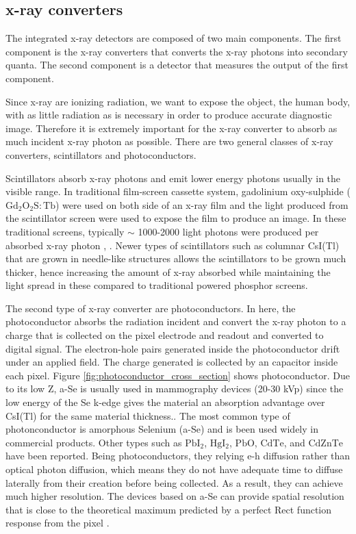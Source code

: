 \subsection{x-ray converters}
The integrated x-ray detectors are composed of two main components.  The first component is the x-ray converters that converts the x-ray photons into secondary quanta.  The second component is a detector that measures the output of the first component.

Since x-ray are ionizing radiation, we want to expose the object, the human body, with as little radiation as is necessary in order to produce accurate diagnostic image.  Therefore it is extremely important for the x-ray converter to absorb as much incident x-ray photon as possible.  There are two general classes of x-ray converters, scintillators and photoconductors. 

Scintillators absorb x-ray photons and emit lower energy photons usually in the visible range.  In traditional film-screen cassette system, gadolinium oxy-sulphide ($\mathrm{Gd_2O_2S:Tb}$) were used on both side of an x-ray film and the light produced from the scintillator screen were used to expose the film to produce an image.  In these traditional screens, typically $\sim$ 1000-2000 light photons were produced per absorbed x-ray photon \cite{trauernicht1988}, \cite{trauernicht1990}. Newer types of scintillators such as columnar CsI(Tl) that are grown in needle-like structures allows the scintillators to be grown much thicker, hence increasing the amount of x-ray absorbed while maintaining the light spread in these compared to traditional powered phosphor screens.

The second type of x-ray converter are photoconductors.  In here,  the photoconductor absorbs the radiation incident and convert the x-ray photon to a charge that is collected on the pixel electrode and readout and converted to digital signal.  The electron-hole pairs generated inside the photoconductor drift under an applied field.  The charge generated is collected by an capacitor inside each pixel. Figure \ref{fig:photoconductor_cross_section} shows photoconductor.  Due to its low Z, a-Se is usually used in mammography devices (20-30 kVp) since the low energy of the Se k-edge gives the material an absorption advantage over CsI(Tl) for the same material thickness.\cite{Yorkston2007}.  The most common type of photonconductor is amorphous Selenium (a-Se) and is been used widely in commercial products.  Other types such as $\mathrm{PbI_2}$, $\mathrm{HgI_2}$, $\mathrm{PbO}$, $\mathrm{CdTe}$, and $\mathrm{CdZnTe}$ have been reported.  Being photoconductors, they relying e-h diffusion rather than optical photon diffusion, which means they do not have adequate time to diffuse laterally from their creation before being collected.  As a result, they can achieve much higher resolution.  The devices based on a-Se can provide spatial resolution that is close to the theoretical maximum predicted by a perfect Rect function response from the pixel \cite{hunt5030}. 

